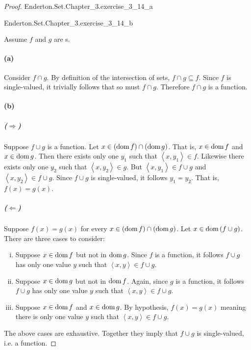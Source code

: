 \documentclass{report}
\begin{document}
\begin{proof}

  \statementpadding

    {Enderton.Set.Chapter\_3.exercise\_3\_14\_a}

    {Enderton.Set.Chapter\_3.exercise\_3\_14\_b}

  Assume $f$ and $g$ are s.

  \paragraph{(a)}%

    Consider $f \cap g$.
    By definition of the intersection of sets, $f \cap g \subseteq f$.
    Since $f$ is single-valued, it trivially follows that so must $f \cap g$.
    Therefore $f \cap g$ is a function.

  \paragraph{(b)}%

    \subparagraph{($\Rightarrow$)}%

      Suppose $f \cup g$ is a function.
      Let $x \in (\mathop{\text{dom}}{f}) \cap (\mathop{\text{dom}}{g})$.
      That is, $x \in \mathop{\text{dom}}{f}$ and $x \in \mathop{\text{dom}}{g}$.
      Then there exists only one $y_1$ such that $\left< x, y_1 \right> \in f$.
      Likewise there exists only one $y_2$ such that
        $\left< x, y_2 \right> \in g$.
      But $\left< x, y_1 \right> \in f \cup g$ and
        $\left< x, y_2 \right> \in f \cup g$.
      Since $f \cup g$ is single-valued, it follows $y_1 = y_2$.
      That is, $f(x) = g(x)$.

    \subparagraph{($\Leftarrow$)}%

      Suppose $f(x) = g(x)$ for every $x \in (\mathop{\text{dom}}{f}) \cap (\mathop{\text{dom}}{g})$.
      Let $x \in \mathop{\text{dom}}{(f \cup g)}$.
      There are three cases to consider:

      \begin{enumerate}[(i)]
        \item Suppose $x \in \mathop{\text{dom}}{f}$ but not in $\mathop{\text{dom}}{g}$.
          Since $f$ is a function, it follows $f \cup g$ has only one value $y$
            such that $\left< x, y \right> \in f \cup g$.
        \item Suppose $x \in \mathop{\text{dom}}{g}$ but not in $\mathop{\text{dom}}{f}$.
          Again, since $g$ is a function, it follows $f \cup g$ has only one
            value $y$ such that $\left< x, y \right> \in f \cup g$.
        \item Suppose $x \in \mathop{\text{dom}}{f}$ and $x \in \mathop{\text{dom}}{g}$.
          By hypothesis, $f(x) = g(x)$ meaning there is only one value $y$ such
            that $\left< x, y \right> \in f \cup g$.
      \end{enumerate}

      The above cases are exhaustive.
      Together they imply that $f \cup g$ is single-valued, i.e. a function.

\end{proof}
\end{document}
